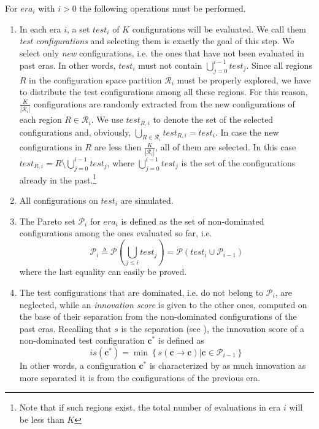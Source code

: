 For $era_{i}$ with $i>0$ the following operations must be performed.
\begin{enumerate}
\item \label{pers02.enu:K}
In each era $i$, a set $test_i$ of $K$ configurations will be evaluated. We call them \emph{test configurations} and selecting them is exactly the goal of this step.
We select only \emph{new} configurations, i.e. the ones that have not been evaluated in past eras. In other words, $test_i$ must not contain $\bigcup_{j=0}^{i-1}test_{j}$.
Since all regions $R$ in the configuration space partition $\mathcal{R}_{i}$ must be properly explored, we have to distribute the test configurations among all these regions. For this reason, $\frac{K}{\left|\mathcal{R}_{i}\right|}$ configurations are randomly extracted from the new configurations of each region $R\in\mathcal{R}_{i}$. We use $test_{R,i}$ to denote the set of the selected configurations and, obviously, $\bigcup_{R\in\mathcal{R}_{i}} test_{R,i} = test_i$.
 In case the new configurations in $R$ are less then $\frac{K}{\left|\mathcal{R}_{i}\right|}$, all of them are selected. In this case $test_{R,i}=R\setminus\bigcup_{j=0}^{i-1}test_{j}$, where  $\bigcup_{j=0}^{i-1}test_{j}$ is the set of the configurations already in the past.\footnote{Note that if such regions exist, the total number of evaluations in era $i$ will be less than $K$}
\item All configurations on $test_{i}$ are simulated.
\item The Pareto set $\mathscr{P}_{i}$ for $era_{i}$ is defined as the set of non-dominated configurations among the ones evaluated so far, i.e.
	\[
	\mathscr{P}_{i} \triangleq
	\mathscr{P}\left(\bigcup_{j\leq i}test_j\right)=
	\mathscr{P}\left(test_{i}\cup\mathscr{P}_{i-1}\right)
	\]
where the last equality can easily be proved.

\item \label{pers02.enu:novelty_score_of_a_configuration}
The test configurations that are dominated, i.e. do not belong to $\mathscr{P}_i$, are neglected, while an \emph{innovation score} is given to the other ones, computed on the base of their separation from the non-dominated configurations of the past eras. Recalling that $s$ is the separation (see ), the innovation score of a non-dominated test configuration $\mathbf{c}^*$ is defined as
	\[
	is\left(\mathbf{c}^*\right)=\min\left\{ \left.s\left(\mathbf{c}\rightarrow\mathbf{c} \right)\right|\mathbf{c}\in\mathscr{P}_{i-1}\right\} 
	\]
In other words, a configuration $\mathbf{c}^*$ is characterized by as much innovation
as more separated it is from the configurations of the previous era.


\end{enumerate}
